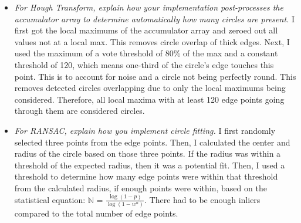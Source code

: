 \documentclass[11pt]{article}
\begin{document}
\begin{itemize}
        \item \textit{For Hough Transform, explain how your implementation post-processes the
        accumulator array to determine automatically how many circles are present.}\newline
        I first got the local maximums of the accumulator array and zeroed out all values not at a local max. This
        removes circle overlap of thick edges. Next, I used the maximum of a vote threshold of 80\% of the max
        and a constant threshold of 120, which means one-third of the
        circle's edge touches this point. This is to account for noise and a circle not being perfectly round. This
        removes detected circles overlapping due to only the local maximums being considered. Therefore, all local
        maxima with at least 120 edge points going through them are considered circles.\newline

        \item \textit{For RANSAC, explain how you implement circle fitting.}\newline
        I first randomly selected three points from the edge points. Then, I calculated the center and radius of the
        circle based on those three points. If the radius was within a threshold of the expected radius, then it was
        a potential fit. Then, I used a threshold to determine how many edge points were within that threshold from
        the calculated radius, if enough points were within, based on the statistical equation:
        $\mathbb{N}$ = $\frac{\log(1 - p)}{\log(1 - w^n)}$. There had to be enough inliers compared to the total
        number of edge points.\newline


\end{itemize}
\end{document}
